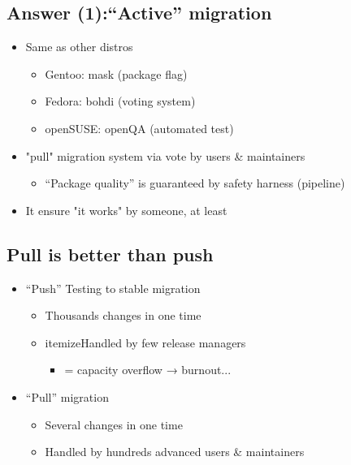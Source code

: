 \documentclass[mingoth,a4paper]{jsarticle}
\begin{document}
\subsection{Answer (1):“Active” migration}

\begin{itemize}
 \item Same as other distros
  \begin{itemize}
   \item  Gentoo: mask (package flag)
   \item  Fedora: bohdi (voting system)
   \item  openSUSE: openQA (automated test)
  \end{itemize}
 \item "pull" migration system via vote by users \& maintainers
  \begin{itemize}
   \item “Package quality” is guaranteed by safety harness (pipeline)
  \end{itemize}
 \item It ensure "it works" by someone, at least
\end{itemize}

\subsection{Pull is better than push}
\begin{itemize}
 \item “Push” Testing to stable migration
  \begin{itemize}
    \item Thousands changes in one time
    \item {itemize}Handled by few release managers
     \begin{itemize}
      \item = capacity overflow → burnout...
     \end{itemize}
  \end{itemize}
\end{itemize}

\begin{itemize}
 \item “Pull” migration
  \begin{itemize}
    \item Several changes in one time
    \item Handled by hundreds advanced users \& maintainers
  \end{itemize}
\end{itemize}
\end{document}
